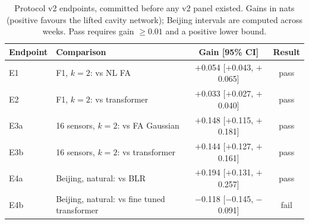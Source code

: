 \begin{table}[t]
\centering\small
\caption{\label{tab:v2}Protocol v2 endpoints, committed before any v2 panel existed. Gains in nats (positive favours the lifted cavity network); Beijing intervals are computed across weeks. Pass requires gain $\geq0.01$ and a positive lower bound.}
\begin{tabular}{llcc}
\toprule
Endpoint & Comparison & Gain [95\% CI] & Result\\
\midrule
E1 & F1, $k=2$: vs NL FA & $+$0.054 [$+$0.043, $+$0.065] & pass\\
E2 & F1, $k=2$: vs transformer & $+$0.033 [$+$0.027, $+$0.040] & pass\\
E3a & 16 sensors, $k=2$: vs FA Gaussian & $+$0.148 [$+$0.115, $+$0.181] & pass\\
E3b & 16 sensors, $k=2$: vs transformer & $+$0.144 [$+$0.127, $+$0.161] & pass\\
E4a & Beijing, natural: vs BLR & $+$0.194 [$+$0.131, $+$0.257] & pass\\
E4b & Beijing, natural: vs fine tuned transformer & $-$0.118 [$-$0.145, $-$0.091] & fail\\
\bottomrule
\end{tabular}
\end{table}
